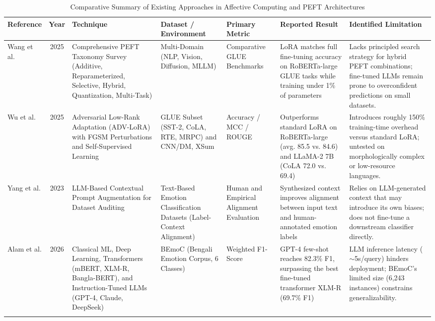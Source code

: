 \documentclass[conference]{IEEEtran}
\begin{document}
\begin{table}[t]
\centering
\caption{Comparative Summary of Existing Approaches in Affective Computing and PEFT Architectures}
\label{tab:peft_literature_comparison}
\scriptsize
\setlength{\tabcolsep}{4pt} %
\begin{tabularx}{\textwidth}{@{} >{\hsize=0.85\hsize}X c >{\hsize=1.05\hsize}X >{\hsize=1.0\hsize}X >{\hsize=0.85\hsize}X >{\hsize=1.05\hsize}X >{\hsize=1.2\hsize}X @{}}
\toprule
\textbf{Reference} & \textbf{Year} & \textbf{Technique} & \textbf{Dataset / Environment} & \textbf{Primary Metric} & \textbf{Reported Result} & \textbf{Identified Limitation} \\
\midrule

Wang et al. \cite{wang2025peft} & 2025 & Comprehensive PEFT Taxonomy Survey (Additive, Reparameterized, Selective, Hybrid, Quantization, Multi-Task) & Multi-Domain (NLP, Vision, Diffusion, MLLM) & Comparative GLUE Benchmarks & LoRA matches full fine-tuning accuracy on RoBERTa-large GLUE tasks while training under 1\% of parameters & Lacks principled search strategy for hybrid PEFT combinations; fine-tuned LLMs remain prone to overconfident predictions on small datasets. \\
\addlinespace

Wu et al. \cite{wu2025advlora} & 2025 & Adversarial Low-Rank Adaptation (ADV-LoRA) with FGSM Perturbations and Self-Supervised Learning & GLUE Subset (SST-2, CoLA, RTE, MRPC) and CNN/DM, XSum & Accuracy / MCC / ROUGE & Outperforms standard LoRA on RoBERTa-large (avg. 85.5 vs. 84.6) and LLaMA-2 7B (CoLA 72.0 vs. 69.4) & Introduces roughly 150\% training-time overhead versus standard LoRA; untested on morphologically complex or low-resource languages. \\
\addlinespace

Yang et al. \cite{yang2023context} & 2023 & LLM-Based Contextual Prompt Augmentation for Dataset Auditing & Text-Based Emotion Classification Datasets (Label-Context Alignment) & Human and Empirical Alignment Evaluation & Synthesized context improves alignment between input text and human-annotated emotion labels & Relies on LLM-generated context that may introduce its own biases; does not fine-tune a downstream classifier directly. \\
\addlinespace

Alam et al. \cite{alam2026beyond} & 2026 & Classical ML, Deep Learning, Transformers (mBERT, XLM-R, Bangla-BERT), and Instruction-Tuned LLMs (GPT-4, Claude, DeepSeek) & BEmoC (Bengali Emotion Corpus, 6 Classes) & Weighted F1-Score & GPT-4 few-shot reaches 82.3\% F1, surpassing the best fine-tuned transformer XLM-R (69.7\% F1) & LLM inference latency ($\sim$5s/query) hinders deployment; BEmoC's limited size (6{,}243 instances) constrains generalizability. \\
\addlinespace


\end{tabularx}
\end{table}
\end{document}
